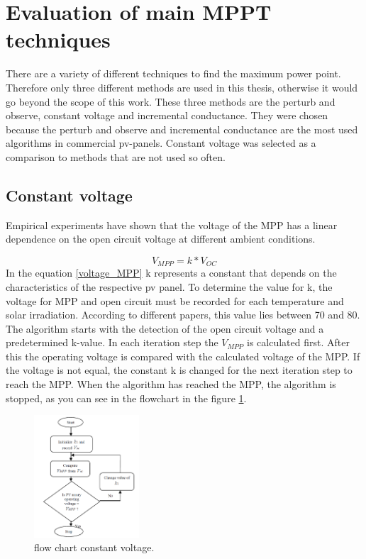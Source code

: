 \section{Evaluation of main MPPT techniques\label{MPPTalgo}}

There are a variety of different techniques to find the maximum power point. Therefore only three different methods are used in this thesis, otherwise it would go beyond the scope of this work. These three methods are the perturb and observe, constant voltage and incremental conductance. They were chosen because the perturb and observe and incremental conductance are the most used algorithms in commercial pv-panels. Constant voltage was selected as a comparison to methods that are not used so often. 

\subsection{Constant voltage}
Empirical experiments have shown that the voltage of the MPP has a linear dependence on the open circuit voltage at different ambient conditions.

\begin{equation} \label{voltage_MPP}
V_{MPP} = k * V_{OC}	
\end{equation} 
In the equation \ref{voltage_MPP} k represents a constant that depends on the characteristics of the respective pv panel. To determine the value for k, the voltage for MPP and open circuit must be recorded for each temperature and solar irradiation. According to different papers, this value lies between 70 and 80. The algorithm starts with the detection of the open circuit voltage and a predetermined k-value. In each iteration step the $V_{MPP}$ is calculated first. After this the operating voltage is compared with the calculated voltage of the MPP. If the voltage is not equal, the constant k is changed for the next iteration step to reach the MPP. When the algorithm has reached the MPP, the algorithm is stopped, as you can see in the flowchart in the figure \ref{fcconstantvoltage}\cite{}.

\begin{figure}[htbp]
	\begin{center}
		\includegraphics[width=0.35\textwidth]{../Pictures/P1/Flow_chart/Flow_chart_constant_voltage}
		\caption{flow chart constant voltage\cite{}. }
		\label{fcconstantvoltage}
	\end{center}	
\end{figure}

